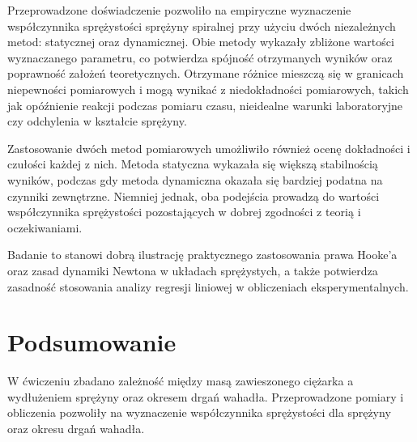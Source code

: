 \documentclass[12pt]{article}
\begin{document}
Przeprowadzone doświadczenie pozwoliło na empiryczne wyznaczenie współczynnika sprężystości sprężyny spiralnej przy użyciu dwóch niezależnych metod: statycznej oraz dynamicznej. Obie metody wykazały zbliżone wartości wyznaczanego parametru, co potwierdza spójność otrzymanych wyników oraz poprawność założeń teoretycznych. Otrzymane różnice mieszczą się w granicach niepewności pomiarowych i mogą wynikać z niedokładności pomiarowych, takich jak opóźnienie reakcji podczas pomiaru czasu, nieidealne warunki laboratoryjne czy odchylenia w kształcie sprężyny.

Zastosowanie dwóch metod pomiarowych umożliwiło również ocenę dokładności i czułości każdej z nich. Metoda statyczna wykazała się większą stabilnością wyników, podczas gdy metoda dynamiczna okazała się bardziej podatna na czynniki zewnętrzne. Niemniej jednak, oba podejścia prowadzą do wartości współczynnika sprężystości pozostających w dobrej zgodności z teorią i oczekiwaniami.

Badanie to stanowi dobrą ilustrację praktycznego zastosowania prawa Hooke’a oraz zasad dynamiki Newtona w układach sprężystych, a także potwierdza zasadność stosowania analizy regresji liniowej w obliczeniach eksperymentalnych.
\section*{Podsumowanie}
W ćwiczeniu zbadano zależność między masą zawieszonego ciężarka a wydłużeniem sprężyny oraz okresem drgań wahadła.
Przeprowadzone pomiary i obliczenia pozwoliły na wyznaczenie współczynnika sprężystości dla sprężyny oraz okresu drgań wahadła.
\end{document}
